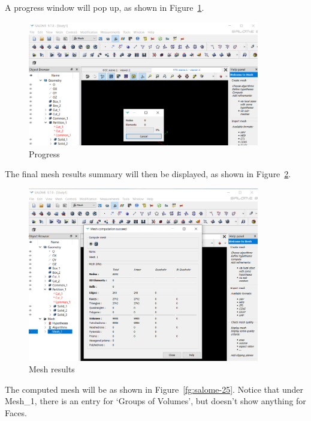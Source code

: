 A progress window will pop up, as shown in Figure~\ref{fg:salome-23}.

\begin{figure}[H]
\centering
\includegraphics[width=0.9\textwidth]{Salome-23}
\caption{Progress}\label{fg:salome-23}
\end{figure}

The final mesh results summary will then be displayed, as shown in Figure~\ref{fg:salome-24}.

\begin{figure}[H]
\centering
\includegraphics[width=0.9\textwidth]{Salome-24}
\caption{Mesh results}\label{fg:salome-24}
\end{figure}

The computed mesh will be as shown in Figure~\ref{fg:salome-25}.  Notice that under Mesh\_1, there is an entry for `Groups of Volumes', but doesn't show anything for Faces.

